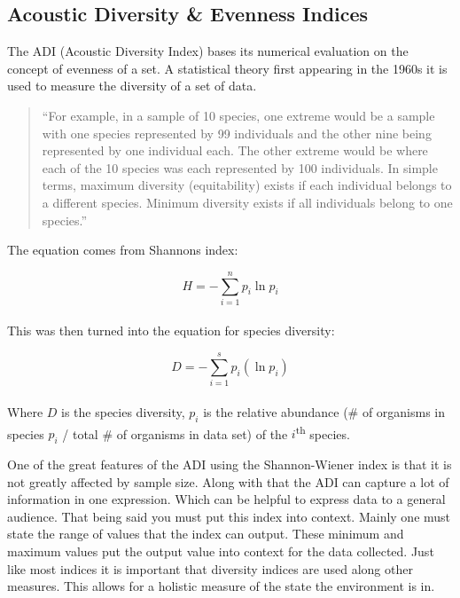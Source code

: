 \subsection{Acoustic Diversity \& Evenness Indices}
The ADI (Acoustic Diversity Index) bases it\textquotesingle s numerical evaluation on the concept of evenness of a set. A statistical theory first appearing in the 1960\textquotesingle s it is used to measure the diversity of a set of data.\par

\begin{quote}
  ``For example, in a sample of 10 species, one extreme would be a sample with one species represented by 99 individuals and the other nine being represented by one individual each. The other extreme would be where each of the 10 species was each represented by 100 individuals. In simple terms, maximum diversity (equitability) exists if each individual belongs to a different species. Minimum diversity exists if all individuals belong to one species.''\cite{shannonWiener}
\end{quote}

The equation comes from Shannon\textquotesingle s index:\par

\begin{equation}
  H = -\sum_{i=1}^n{p_i \ln p_i}
\end{equation} \\[-24pt]

This was then turned into the equation for species diversity:\par

\begin{equation}
  D = -\sum_{i=1}^s{p_i (\ln p_i)}
\end{equation} \\[-24pt]

Where $D$ is the species diversity, $p_i$ is the relative abundance (\# of organisms in species $p_i$ / total \# of organisms in data set) of the $i$\textsuperscript{th} species.\par
One of the great features of the ADI using the Shannon-Wiener index is that it is not greatly affected by sample size. Along with that the ADI can capture a lot of information in one expression. Which can be helpful to express data to a general audience. That being said you must put this index into context. Mainly one must state the range of values that the index can output. These minimum and maximum values put the output value into context for the data collected. Just like most indices it is important that diversity indices are used along other measures. This allows for a holistic measure of the state the environment is in.\cite{shannonWiener}\par
